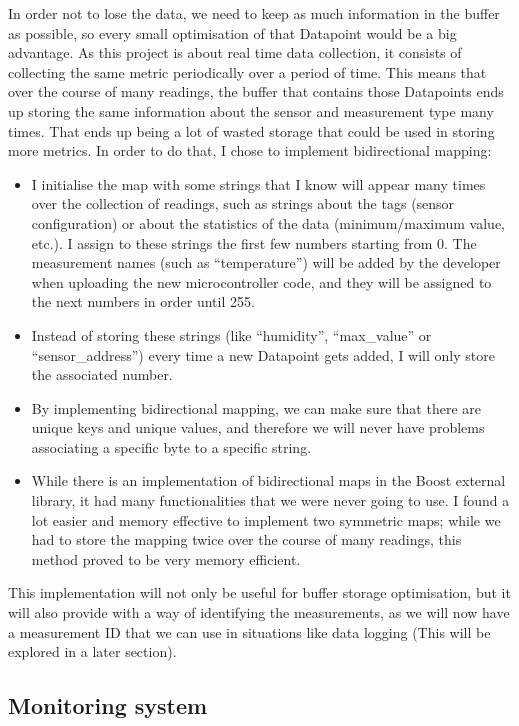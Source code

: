 \documentclass[12pt]{article}
\begin{document}
In order not to lose the data, we need to keep as much information in the buffer as possible, so every small optimisation of that Datapoint would be a big advantage. As this project is about real time data collection, it consists of collecting the same metric periodically over a period of time. This means that over the course of many readings, the buffer that contains those Datapoints ends up storing the same information about the sensor and measurement type many times. That ends up being a lot of wasted storage that could be used in storing more metrics. In order to do that, I chose to implement bidirectional mapping: \par

\begin{itemize}
    \item I initialise the map with some strings that I know will appear many times over the collection of readings, such as strings about the tags (sensor configuration) or about the statistics of the data (minimum/maximum value, etc.). I assign to these strings the first few numbers starting from 0. The measurement names (such as ``temperature'') will be added by the developer when uploading the new microcontroller code, and they will be assigned to the next numbers in order until 255.
    \item Instead of storing these strings (like ``humidity'', ``max\_value'' or ``sensor\_address'') every time a new Datapoint gets added, I will only store the associated number. 
    \item By implementing bidirectional mapping, we can make sure that there are unique keys and unique values, and therefore we will never have problems associating a specific byte to a specific string.
    \item While there is an implementation of bidirectional maps in the Boost external library, it had many functionalities that we were never going to use. I found a lot easier and memory effective to implement two symmetric maps; while we had to store the mapping twice over the course of many readings, this method proved to be very memory efficient. 
\end{itemize}

This implementation will not only be useful for buffer storage optimisation, but it will also provide with a way of identifying the measurements, as we will now have a measurement ID that we can use in situations like data logging (This will be explored in a later section).

\subsection{Monitoring system}
\end{document}
